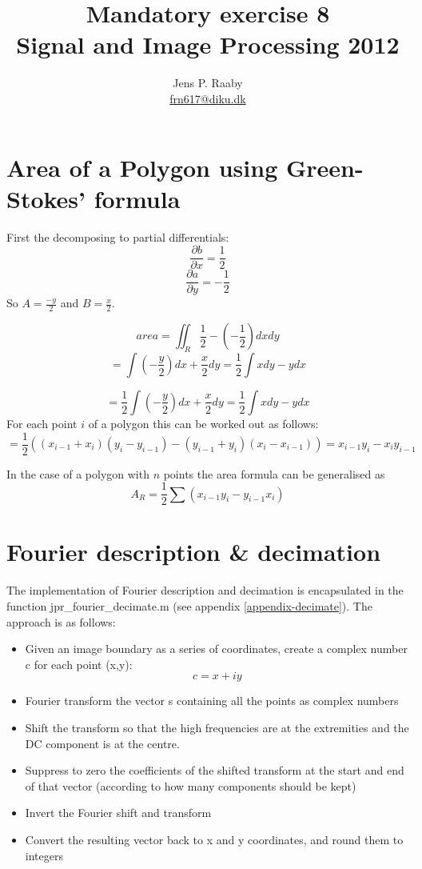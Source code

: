 \documentclass[a4paper]{article}
\title{Mandatory exercise 8 \\
Signal and Image Processing 2012}
\author{Jens P. Raaby \\
\url{frn617@diku.dk}}
\begin{document}
 
\maketitle

\section{Area of a Polygon using Green-Stokes' formula}

First the decomposing to partial differentials:
\[
\frac{\partial b}{\partial x} = \frac{1}{2}
\]
\[
\frac{\partial a}{\partial y} = - \frac{1}{2}
\]
So
$
A = \frac{ -y}{2}
$ and
$
B = \frac{ x}{2}
$.

\[
area = \iint_R \frac{1}{2} - (-\frac{1}{2}) dx dy
\]
\[
 = \int (-\frac{y}{2}) dx + \frac{x}{2} dy = \frac{1}{2} \int x dy - ydx
\]

\[
 = \frac{1}{2} \int (-\frac{y}{2}) dx + \frac{x}{2} dy = \frac{1}{2} \int x dy - ydx
\]
For each point $i$ of a polygon this can be worked out as follows:
\[
= \frac{1}{2} ( (x_{i-1} + x_i)(y_i - y_{i-1}) - (y_{i-1} + y_i)(x_i-x_{i-1}) ) = x_{i-1} y_i - x_i y_{i-1}
\]


In the case of a polygon with $n$ points the area formula can be generalised as
\[
A_R = \frac{1}{2} \sum (x_{i-1} y_i - y_{i-1} x_i)
\]
\section{Fourier description \& decimation}
The implementation of Fourier description and decimation is encapsulated in the function jpr\_fourier\_decimate.m (see appendix \ref{appendix-decimate}). The approach is as follows:


\begin{itemize}

    \item Given an image boundary as a series of coordinates, create a complex number c for each point (x,y):
\[
c = x + i y
\]


    \item Fourier transform the vector s containing all the points as complex numbers

    \item Shift the transform so that the high frequencies are at the extremities and the DC component is at the centre.
    
    \item Suppress to zero the coefficients of the shifted transform at the start and end of that vector (according to how many components should be kept)
    
    \item Invert the Fourier shift and transform
    
    \item Convert the resulting vector back to x and y coordinates, and round them to integers
\end{itemize}
\end{document}

